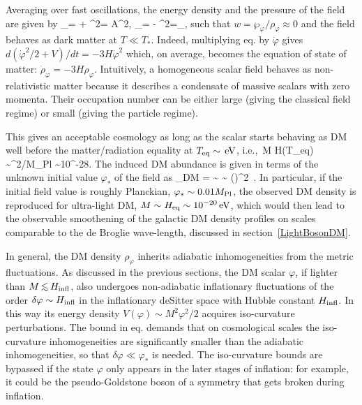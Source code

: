 Averaging over fast oscillations, the energy density and the pressure of the field are given by
\beq 
\rho_\varphi = \bigg\langle {} + \varphi^2\bigg\rangle=
 A^2,\qquad
\wp_\varphi = \bigg\langle {} - \varphi^2\bigg\rangle=\ll \rho_\varphi,
\eeq
such that $w = \wp_\varphi/\rho_\varphi \approx 0$ and the field behaves as dark matter
at $T\ll T_*$.
Indeed, multiplying eq. by $\dot\varphi$ gives
$d(\dot\varphi^2/2 + V)/dt = - 3H \dot\varphi^2$ which, on average, becomes
the equation of state of matter: $\dot\rho_\varphi = - 3 H \rho_\varphi$.
Intuitively, a homogeneous scalar field behaves as non-relativistic matter because it describes a condensate
of massive scalars with zero momenta.
Their occupation number can be either large (giving the classical field regime) or small (giving the particle regime).

\smallskip

This gives an acceptable cosmology as long as the scalar starts behaving as DM well before the
matter/radiation equality at $T_{\rm eq} \sim \,{\rm eV}$, i.e.,\
\beq  M \gg  H(T_{\rm eq}) \sim \eV^2/M_{\rm Pl} \sim 10^{-28}\eV.\eeq
The induced DM abundance is given in terms of the unknown initial value $\varphi_*$ of the field as
\beq\label{eq:OmegaULS}
 \Omega_{\rm DM} = \sim
{}\sim 
\sqrt{\frac{M^2}{M(\varphi_*)\eV}}\left(\frac{\varphi_*}{10^{11}\GeV}\right)^2\  .\eeq
In particular, if the initial field value is roughly Planckian, $\varphi_* \sim 0.01  M_{\rm Pl}$, 
the observed DM density is reproduced for ultra-light DM,
$M\sim H_{\rm eq}\sim 10^{-20}\,{\rm eV} $, which would then lead to the observable
smoothening of the galactic
DM density profiles on scales comparable to the de Broglie wave-length, 
discussed in section~\ref{LightBosonDM}.

\smallskip

In general, the DM density $\rho_\varphi$ inherits adiabatic inhomogeneities from the metric fluctuations.
As discussed in the previous sections, the DM scalar $\varphi$, if lighter than $M \circa{<} H_{\rm infl}$, also
undergoes non-adiabatic inflationary fluctuations of the order $ \delta\varphi \sim H_{\rm infl}$
in the inflationary deSitter space with Hubble constant $H_{\rm infl}$.
In this way its energy density $V(\varphi) \sim M^2  \varphi^2/2$ acquires iso-curvature perturbations.
The bound in eq.\eq{isocurvaturebound} demands that on cosmological scales the iso-curvature inhomogeneities are significantly
smaller than the adiabatic inhomogeneities, so that $\delta\varphi \ll \varphi_*$ is needed.
The iso-curvature bounds are bypassed if the state $\varphi$ only appears in the later stages of inflation:
for example, it could be the pseudo-Goldstone boson of a symmetry that gets broken during inflation.


